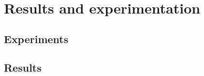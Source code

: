 
\chapter{Results and experimentation}\label{chapter:results}
	
	\section{Experiments}
	
	\section{Results}